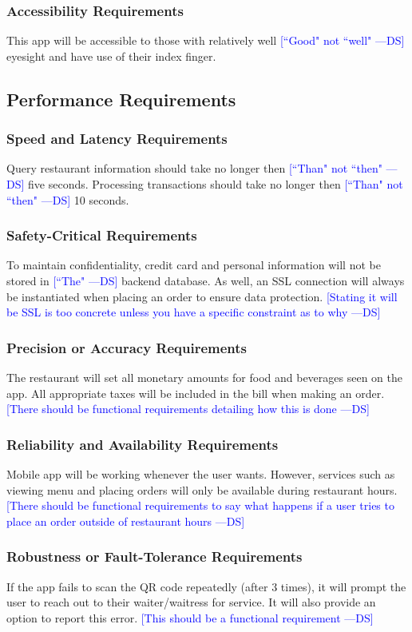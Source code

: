\documentclass[12pt, titlepage]{article}
\newcommand{\authornote}[3]{\textcolor{#1}{[#3 ---#2]}}
\newcommand{\authornote}[3]{}
\newcommand{\ds}[1]{\authornote{blue}{DS}{#1}}
\begin{document}
\subsubsection{Accessibility Requirements}
This app will be accessible to those with relatively well
\ds{``Good" not ``well"}
eyesight and have use of their index finger. 
 
\subsection{Performance Requirements}

\subsubsection{Speed and Latency Requirements}
Query restaurant information should take no longer then
\ds{``Than" not ``then"}
five seconds. Processing transactions should take no longer then
\ds{``Than" not ``then"}
10 seconds.  

\subsubsection{Safety-Critical Requirements}
To maintain confidentiality, credit card and personal information will not be stored in
\ds{``The"} backend database. As well, an SSL connection will always be instantiated when placing an order to ensure data protection. 
\ds{Stating it will be SSL is too concrete unless you have a specific
constraint as to why}
\subsubsection{Precision or Accuracy Requirements}
The restaurant will set all monetary amounts for food and beverages seen on the app. All appropriate taxes will be included in the bill when making an order.  
\ds{There should be functional requirements detailing how this is done}
\subsubsection{Reliability and Availability Requirements}
Mobile app will be working whenever the user wants. However, services such as viewing menu and placing orders will only be available during restaurant hours.
\ds{There should be functional requirements to say what happens if a user
tries to place an order outside of restaurant hours}

\subsubsection{Robustness or Fault-Tolerance Requirements}
If the app fails to scan the QR code repeatedly (after 3 times), it will prompt the user to reach out to their waiter/waitress for service. It will also provide an option to report this error.
\ds{This should be a functional requirement}
\end{document}
